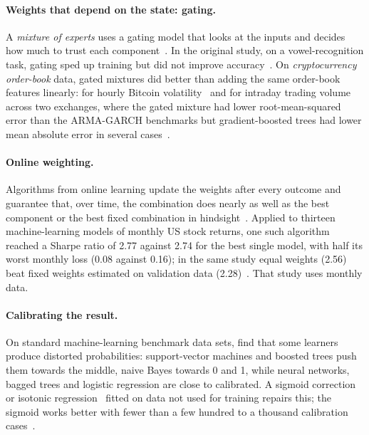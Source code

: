 \paragraph{Weights that depend on the state: gating.} A \emph{mixture of experts} uses a gating model that
looks at the inputs and decides how much to trust each component~\citep{jacobs1991,jordan1994hme}. In the
original study, on a vowel-recognition task, gating sped up training but did not improve
accuracy~\citep{jacobs1991}. On \emph{cryptocurrency order-book} data, gated mixtures did better than adding the same order-book features linearly: for hourly
Bitcoin volatility~\citep{guo2018btcvol} and for intraday trading volume across two exchanges, where the
gated mixture had lower root-mean-squared error than the ARMA-GARCH benchmarks but gradient-boosted trees
had lower mean absolute error in several cases~\citep{antulov2021tme}.

\paragraph{Online weighting.} Algorithms from online learning update the weights after every outcome and
guarantee that, over time, the combination does nearly as well as the best component or the best fixed
combination in hindsight~\citep{littlestone1994,freund1997,cesabianchi2006}. Applied to thirteen
machine-learning models of monthly US stock returns, one such algorithm reached a Sharpe ratio of 2.77 against 2.74 for the
best single model, with half its worst monthly loss (0.08 against 0.16); in the same study equal weights
(2.56) beat fixed weights estimated on validation data (2.28)~\citep{remlinger2023}. That study uses monthly
data.

\paragraph{Calibrating the result.}\label{par:meta-calib} On standard machine-learning benchmark data sets, \citet{niculescu2005} find that some learners
produce distorted probabilities: support-vector machines and boosted trees push them towards the middle, naive Bayes towards
0 and 1, while neural networks, bagged trees and logistic regression are close to calibrated. A sigmoid
correction~\citep{platt1999} or isotonic regression~\citep{zadrozny2002} fitted on data not used for
training repairs this; the sigmoid works better with fewer than a few hundred to a thousand calibration
cases~\citep{niculescu2005}.

